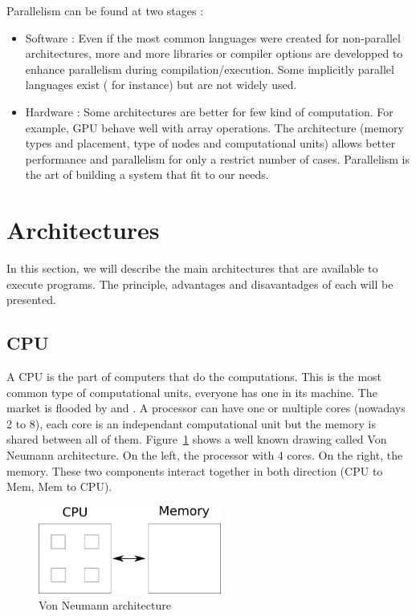 Parallelism can be found at two stages :
\begin{itemize}
\item Software : Even if the most common languages were created for non-parallel architectures, more and more libraries or compiler options are developped to enhance parallelism during compilation/execution. Some implicitly parallel languages exist ( for instance) but are not widely used.
\item Hardware : Some architectures are better for few kind of computation. For example, \ac{GPU} behave well with array operations. The architecture (memory types and placement, type of nodes and computational units) allows better performance and parallelism for only a restrict number of cases. Parallelism is the art of building a system that fit to our needs.
\end{itemize}

\section{Architectures}
In this section, we will describe the main architectures that are available to execute programs. The principle, advantages and disavantadges of each will be presented.

\subsection{CPU}
A \ac{CPU} is the part of computers that do the computations. This is the most common type of computational units, everyone has one in its machine. The market is flooded  by  and . A processor can have one or multiple cores (nowadays 2 to 8), each core is an independant computational unit but the memory is shared between all of them. Figure~\ref{fig:VonNeumann} shows a well known drawing called Von Neumann architecture. On the left, the processor with 4 cores. On the right, the memory. These two components interact together in both direction (\ac{CPU} to Mem, Mem to \ac{CPU}).
\begin{figure}
\centering
\includegraphics[width=6cm]{gfx/Parallelism/VonNeumann.png}
\caption{Von Neumann architecture}
\label{fig:VonNeumann}
\end{figure}

